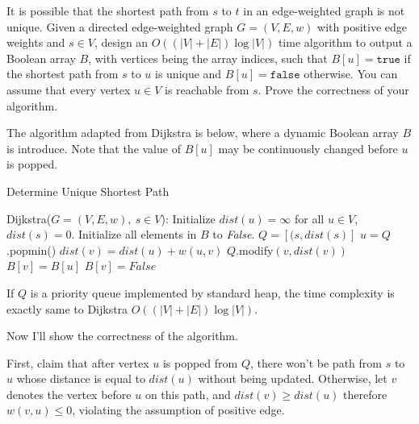 \documentclass{oxmathproblems}
\begin{document}
\begin{questions}
\begin{Solution}
\begin{parts}
\end{parts}

\end{Solution}
\newpage

\miquestion[25]
It is possible that the shortest path from $s$ to $t$ in an edge-weighted graph is not unique.
Given a directed edge-weighted graph $G=(V,E,w)$ with positive edge weights and $s\in V$, design an $O((|V|+|E|)\log|V|)$ time algorithm to output a Boolean array $B$, with vertices being the array indices, such that $B[u]=\texttt{true}$ if the shortest path from $s$ to $u$ is unique and $B[u]=\texttt{false}$ otherwise.
You can assume that every vertex $u\in V$ is reachable from $s$.
Prove the correctness of your algorithm.

\begin{Solution}
The algorithm adapted from Dijkstra is below, where a dynamic Boolean array $B$ is introduce. Note that the value of $B[u]$ may be continuously changed before $u$ is popped.

\begin{algorithm}[H]
    \caption{Determine Unique Shortest Path}
    \label{main2}
    \begin{algorithmic}[1]
        \renewcommand{\algorithmicrequire}{\textbf{function}}
        \REQUIRE Dijkstra($G=(V, E, w),\ s\in V$):
        \STATE Initialize $dist(u)=\infty$ for all $u\in V$, $dist(s)=0$.
        \STATE Initialize all elements in $B$ to \textit{False}.
        \STATE $Q=[(s, dist(s)]$
            \STATE $u=Q$.popmin()
                    \STATE $dist(v)=dist(u)+w(u, v)$
                    \STATE $Q$.modify$(v, dist(v))$
                    \STATE $B[v]=B[u]$
                    \STATE $B[v]=False$
                \ENDIF
            \ENDFOR
        \ENDWHILE
    \end{algorithmic}
\end{algorithm}

If $Q$ is a priority queue implemented by standard heap, the time complexity is exactly same to Dijkstra $O((|V|+|E|)\log|V|)$.

Now I'll show the correctness of the algorithm. 

First, claim that after vertex $u$ is popped from $Q$, there won't be path from $s$ to $u$ whose distance is equal to $dist(u)$ without being updated. Otherwise, let $v$ denotes the vertex before $u$ on this path, and $dist(v)\geq dist(u)$ therefore $w(v, u)\leq0$, violating the assumption of positive edge. 


\end{Solution}
\end{questions}
\end{document}

